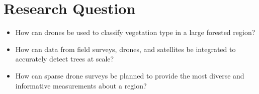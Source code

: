 
\chapter{Research Question} \label{chapResearchQuestion}

\begin{itemize}
    \item How can drones be used to classify vegetation type in a large forested region?
    \item How can data from field surveys, drones, and satellites be integrated to accurately detect trees at scale?
    \item How can sparse drone surveys be planned to provide the most diverse and informative measurements about a region?
\end{itemize}